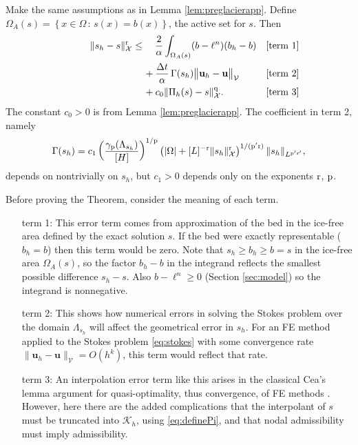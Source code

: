 \documentclass[hidelinks,onefignum,onetabnum,final]{siamart220329}  %
\newcommand{\bu}{\mathbf{u}}
\newcommand{\cK}{\mathcal{K}}
\newcommand{\cV}{\mathcal{V}}
\newcommand{\cX}{\mathcal{X}}
\newcommand{\pp}{{\text{\textnormal{p}}}}
\newcommand{\qq}{{\text{\textnormal{q}}}}
\newcommand{\rr}{{\text{\textnormal{r}}}}
\begin{document}
\begin{theorem} \label{thm:glacierapp} Make the same assumptions as in Lemma \ref{lem:preglacierapp}.  Define $\Omega_A(s) = \left\{x\in\Omega\,:\,s(x)=b(x)\right\}$, the active set for $s$.  Then
\begin{align}
\phantom{dfkljsd} \|s_h-s\|_\cX^\rr &\le \quad \frac{2}{\alpha} \int_{\Omega_A(s)} (b - \ell^n) (b_h - b) &&\text{\textnormal{[term 1]}} \label{eq:glacierestimate} \\
   &\quad\, + \frac{\Delta t}{\alpha} \, \Gamma(s_h) \big\|\bu_h - \bu\big\|_{\cV} &&\text{\textnormal{[term 2]}} \notag \\
   &\quad\, + c_0 \|\Pi_h(s) - s\|_\cX^\qq. &&\text{\textnormal{[term 3]}} \notag
\end{align}
The constant $c_0>0$ is from Lemma \ref{lem:preglacierapp}.  The coefficient in term 2, namely
\begin{equation}
\Gamma(s_h) = c_1 \left(\frac{\gamma_\pp(\Lambda_{s_h})}{[H]}\right)^{1/\pp} \left(|\Omega| + [L]^{-\rr}\|s_h\|_{\cX}^\rr\right)^{1/(\pp'\rr)} \|s_h\|_{L^{\pp'\rr'}},
\end{equation}
depends on nontrivially on $s_h$, but $c_1>0$ depends only on the exponents $\rr$, $\pp$.
\end{theorem}

Before proving the Theorem, consider the meaning of each term.

\medskip
\begin{itemize}
\item[term 1:]  This error term comes from approximation of the bed in the ice-free area defined by the exact solution $s$.  If the bed were exactly representable ($b_h=b$) then this term would be zero.  Note that $s_h \ge b_h \ge b = s$ in the ice-free area $\Omega_A(s)$, so the factor $b_h-b$ in the integrand reflects the smallest possible difference $s_h - s$.  Also $b-\ell^n\ge 0$ (Section \ref{sec:model}) so the integrand is nonnegative.

\item[term 2:]  This shows how numerical errors in solving the Stokes problem over the domain $\Lambda_{s_h}$ will affect the geometrical error in $s_h$.  For an FE method applied to the Stokes problem \eqref{eq:stokes} with some convergence rate $\|\bu_h - \bu\|_{\cV} = O(h^k)$, this term would reflect that rate.

\item[term 3:]  An interpolation error term like this arises in the classical Cea's lemma argument for quasi-optimality, thus convergence, of FE methods \cite{Ciarlet2002}.  However, here there are the added complications that the interpolant of $s$ must be truncated into $\cK_h$, using \eqref{eq:definePi}, and that nodal admissibility must imply admissibility.
\end{itemize}
\end{document}
